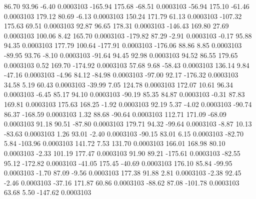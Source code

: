        86.70       93.96       -6.40     0.0003103
     -165.94      175.68      -68.51     0.0003103
      -56.94      175.10      -61.46     0.0003103
      179.12       80.69       -6.13     0.0003103
      150.24      171.79       61.13     0.0003103
     -107.32      175.63       69.51     0.0003103
       92.87       96.65      178.31     0.0003103
     -146.43      169.80       27.69     0.0003103
      100.06        8.42      165.70     0.0003103
     -179.82       87.29       -2.91     0.0003103
       -0.17       95.88       94.35     0.0003103
      177.79      100.64     -177.91     0.0003103
     -176.06       88.86        8.85     0.0003103
      -89.95       93.76       -8.10     0.0003103
      -91.64       94.45       92.98     0.0003103
       94.52       86.55      179.65     0.0003103
        0.52      169.70     -174.92     0.0003103
       57.68        9.68      -58.43     0.0003103
      136.14        9.84      -47.16     0.0003103
       -4.96       84.12      -84.98     0.0003103
      -97.00       92.17     -176.32     0.0003103
       34.58        5.19       60.43     0.0003103
      -39.99        7.05      124.78     0.0003103
      172.07       10.61       96.34     0.0003103
       -6.45       85.17       94.10     0.0003103
      -90.19       85.35       84.87     0.0003103
       -0.31       87.83      169.81     0.0003103
      175.63      168.25       -1.92     0.0003103
       92.19        5.37       -4.02     0.0003103
      -90.74       86.37     -168.59     0.0003103
        1.32       88.68      -90.64     0.0003103
      112.71      171.09      -68.09     0.0003103
       91.18       90.51      -87.80     0.0003103
      179.71       94.32      -99.64     0.0003103
       -8.87       10.13      -83.63     0.0003103
        1.26       93.01       -2.40     0.0003103
      -90.15       83.01        6.15     0.0003103
      -82.70        5.84     -103.96     0.0003103
      141.72        7.53      131.70     0.0003103
      166.01      168.98       80.10     0.0003103
       -2.33      101.19      177.47     0.0003103
       91.90       89.21     -175.61     0.0003103
      -82.55       95.12     -172.82     0.0003103
      -41.05      175.45      -40.69     0.0003103
      176.10       85.84      -99.95     0.0003103
       -1.70       87.09       -9.56     0.0003103
      177.38       91.88        2.81     0.0003103
       -2.38       92.45       -2.46     0.0003103
      -37.16      171.87       60.86     0.0003103
      -88.62       87.08     -101.78     0.0003103
       63.68        5.50     -147.62     0.0003103
